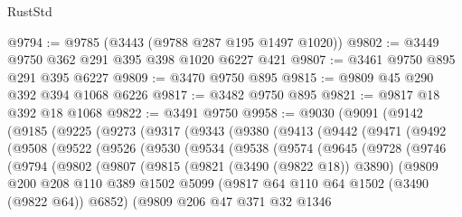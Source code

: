 \begin{lexlean}{RustStd}
\begin{coremodule}
@9794 := @9785 (@3443 (@9788 @287 @195 @1497 @1020))
@9802 := @3449 @9750 @362 @291 @395 @398 @1020 @6227 @421
@9807 := @3461 @9750 @895 @291 @395 @6227
@9809 := @3470 @9750 @895
@9815 := @9809 @45 @290 @392 @394 @1068 @6226
@9817 := @3482 @9750 @895
@9821 := @9817 @18 @392 @18 @1068
@9822 := @3491 @9750
@9958 := @9030
    (@9091
      (@9142
        (@9185
          (@9225
            (@9273
              (@9317
                (@9343
                  (@9380
                    (@9413
                      (@9442
                        (@9471
                          (@9492
                            (@9508
                              (@9522
                                (@9526
                                  (@9530
                                    (@9534
                                      (@9538
                                        (@9574
                                          (@9645
                                            (@9728
                                              (@9746
                                                (@9794
                                                  (@9802
                                                    (@9807
                                                      (@9815
                                                        (@9821 (@3490 (@9822 @18)) @3890)
                                                        (@9809
                                                          @200
                                                          @208
                                                          @110
                                                          @389
                                                          @1502
                                                          @5099
                                                          (@9817
                                                            @64
                                                            @110
                                                            @64
                                                            @1502
                                                            (@3490 (@9822 @64))
                                                            @6852)
                                                          (@9809
                                                            @206
                                                            @47
                                                            @371
                                                            @32
                                                            @1346

\end{coremodule}
\end{lexlean}
